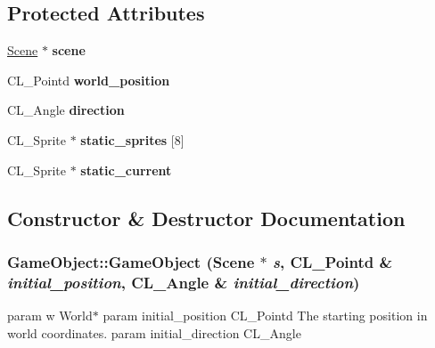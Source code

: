 \subsection*{Protected Attributes}
\begin{DoxyCompactItemize}
\item 
\hypertarget{classGameObject_a6f22d134b69dfa1a1aa4b23935737724}{
\hyperlink{classScene}{Scene} $\ast$ {\bfseries scene}}
\label{classGameObject_a6f22d134b69dfa1a1aa4b23935737724}

\item 
\hypertarget{classGameObject_a605183c5fc859319ced9e786b297e2c2}{
CL\_\-Pointd {\bfseries world\_\-position}}
\label{classGameObject_a605183c5fc859319ced9e786b297e2c2}

\item 
\hypertarget{classGameObject_a8df0dc007367b180dfcd9d2f193f6bdf}{
CL\_\-Angle {\bfseries direction}}
\label{classGameObject_a8df0dc007367b180dfcd9d2f193f6bdf}

\item 
\hypertarget{classGameObject_a5b841978ecf469bc3a69c0d05ad81013}{
CL\_\-Sprite $\ast$ {\bfseries static\_\-sprites} \mbox{[}8\mbox{]}}
\label{classGameObject_a5b841978ecf469bc3a69c0d05ad81013}

\item 
\hypertarget{classGameObject_a22464434abaabf3fb9aab0664dd22eb5}{
CL\_\-Sprite $\ast$ {\bfseries static\_\-current}}
\label{classGameObject_a22464434abaabf3fb9aab0664dd22eb5}

\end{DoxyCompactItemize}


\subsection{Constructor \& Destructor Documentation}
\hypertarget{classGameObject_a9174fcacc9b5ffd21984c6ff4a3b4d57}{
\subsubsection[{GameObject}]{\setlength{\rightskip}{0pt plus 5cm}GameObject::GameObject ({\bf Scene} $\ast$ {\em s}, \/  CL\_\-Pointd \& {\em initial\_\-position}, \/  CL\_\-Angle \& {\em initial\_\-direction})}}
\label{classGameObject_a9174fcacc9b5ffd21984c6ff4a3b4d57}
param w World$\ast$ param initial\_\-position CL\_\-Pointd The starting position in world coordinates. param initial\_\-direction CL\_\-Angle 

